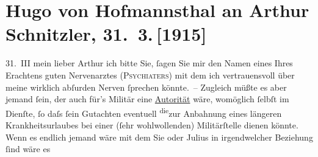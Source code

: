 

         
         \renewcommand{\erwaehntePersonen}{Personen: Hugo August von Hofmannsthal, Julius Schnitzler}
         \renewcommand{\erwaehnteOrte}{Orte: Rodaun, Wien}
         \renewcommand{\erwaehnteWerke}{}
               \section[Hugo von Hofmannsthal an Arthur Schnitzler, 31. 3. {[}1915{]}]{ Hugo von Hofmannsthal an Arthur Schnitzler, 31. 3. {[}1915{]}}\nopagebreak{}\rehead{ }\begin{ledgroupsized}[t]{13cm}\normalsize\beginnumbering \toendnotes[C]{\smallbreak\pagebreak[2]} 
\toendnotes[C]{\smallbreak}\pstart
           \raggedleft{}{\pb}31. III\pend
           \pstart{}mein lieber Arthur\pend\pstart
           ich bitte Sie, ſagen Sie mir den Namen eines Ihres Erachtens guten Nervenarztes (\textsc{Psychiaters}) mit dem ich vertrauensvoll über meine wirklich
               abſurden Nerven ſprechen könnte. – Zugleich müßte es aber jemand ſein, der auch für’s
               Militär eine \uline{Autorität} wäre, womöglich ſelbſt im
               Dienſte, ſo daſs ſein Gutachten eventuell \substVorne{}\textsuperscript{die}\substDazwischen{}zur\substHinten{} Anbahnung eines längeren Krankheitsurlaubes bei einer (ſehr wohlwollenden)
               Militärſtelle dienen könnte.\pend
           \pstart
           Wenn es endlich jemand wäre mit dem Sie  oder Julius in irgendwelcher Beziehung ſind wäre es

\end{ledgroupsized}
